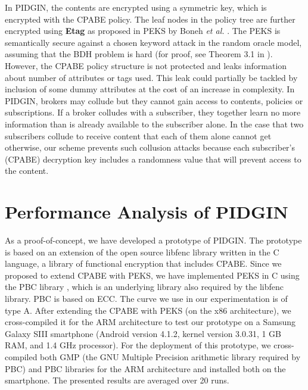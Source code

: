 \documentclass[epsfig,a4paper,11pt,titlepage]{book}
\numberwithin{algorithm}{chapter}
\begin{document}
In \gls{PIDGIN}, the contents are encrypted using a symmetric key, which is encrypted with the \gls{CPABE} policy. The leaf nodes in the policy tree are further encrypted using \textbf{Etag} as proposed in \gls{PEKS} by Boneh \emph{et al.} \cite{Boneh:2004}. The \gls{PEKS} is semantically secure against a chosen keyword attack in the random oracle model, assuming that the \gls{BDH} problem is hard (for proof, see Theorem 3.1 in \cite{Boneh:2004}). However, the \gls{CPABE} policy structure is not protected and leaks information about number of attributes or tags used. This leak could partially be tackled by inclusion of some dummy attributes at the cost of an increase in complexity. In \gls{PIDGIN}, brokers may collude but they cannot gain access to contents, policies or subscriptions. If a broker colludes with a subscriber, they together learn no more information than is already available to the subscriber alone. In the case that two subscribers collude to receive content that each of them alone cannot get otherwise, our scheme prevents such collusion attacks because each subscriber's (\gls{CPABE}) decryption key includes a randomness value that will prevent access to the content.

\section[Performance Analysis of PIDGIN]{Performance Analysis of \gls{PIDGIN}}
\label{sec:pidgin-analysis}

As a proof-of-concept, we have developed a prototype of \gls{PIDGIN}. The prototype is based on an extension of the open source libfenc library \cite{libfenc} written in the C language, a library of functional encryption that includes \gls{CPABE}. Since we proposed to extend \gls{CPABE} with \gls{PEKS}, we have implemented \gls{PEKS} in C using the \gls{PBC} library \cite{Lynn}, which is an underlying library also required by the libfenc library. \gls{PBC} is based on \gls{ECC}. The curve we use in our experimentation is of type A. After extending the \gls{CPABE} with \gls{PEKS} (on the x86 architecture), we cross-compiled it for the ARM architecture to test our prototype on a Samsung Galaxy SIII smartphone (Android version 4.1.2, kernel version 3.0.31, 1 GB RAM, and 1.4 GHz processor). For the deployment of this prototype, we cross-compiled both GMP \cite{GMP} (the GNU Multiple Precision arithmetic library required by \gls{PBC}) and \gls{PBC} libraries for the ARM architecture and installed both on the smartphone. The presented results are averaged over 20 runs.
\end{document}
